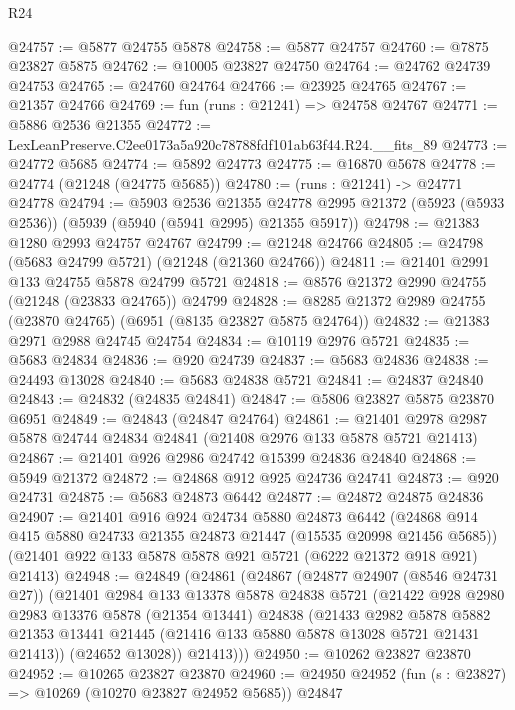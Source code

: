 \begin{lexlean}{R24}
\begin{coremodule}
@24757 := @5877 @24755 @5878
@24758 := @5877 @24757
@24760 := @7875 @23827 @5875
@24762 := @10005 @23827 @24750
@24764 := @24762 @24739 @24753
@24765 := @24760 @24764
@24766 := @23925 @24765
@24767 := @21357 @24766
@24769 := fun (runs : @21241) => @24758 @24767
@24771 := @5886 @2536 @21355
@24772 := LexLeanPreserve.C2ee0173a5a920c78788fdf101ab63f44.R24.__fits_89
@24773 := @24772 @5685
@24774 := @5892 @24773
@24775 := @16870 @5678
@24778 := @24774 (@21248 (@24775 @5685))
@24780 := (runs : @21241) -> @24771 @24778
@24794 := @5903
    @2536
    @21355
    @24778
    @2995
    @21372
    (@5923 (@5933 @2536))
    (@5939 (@5940 (@5941 @2995) @21355 @5917))
@24798 := @21383 @1280 @2993 @24757 @24767
@24799 := @21248 @24766
@24805 := @24798 (@5683 @24799 @5721) (@21248 (@21360 @24766))
@24811 := @21401 @2991 @133 @24755 @5878 @24799 @5721
@24818 := @8576 @21372 @2990 @24755 (@21248 (@23833 @24765)) @24799
@24828 := @8285 @21372 @2989 @24755 (@23870 @24765) (@6951 (@8135 @23827 @5875 @24764))
@24832 := @21383 @2971 @2988 @24745 @24754
@24834 := @10119 @2976 @5721
@24835 := @5683 @24834
@24836 := @920 @24739
@24837 := @5683 @24836
@24838 := @24493 @13028
@24840 := @5683 @24838 @5721
@24841 := @24837 @24840
@24843 := @24832 (@24835 @24841)
@24847 := @5806 @23827 @5875 @23870 @6951
@24849 := @24843 (@24847 @24764)
@24861 := @21401 @2978 @2987 @5878 @24744 @24834 @24841 (@21408 @2976 @133 @5878 @5721 @21413)
@24867 := @21401 @926 @2986 @24742 @15399 @24836 @24840
@24868 := @5949 @21372
@24872 := @24868 @912 @925 @24736 @24741
@24873 := @920 @24731
@24875 := @5683 @24873 @6442
@24877 := @24872 @24875 @24836
@24907 := @21401
    @916
    @924
    @24734
    @5880
    @24873
    @6442
    (@24868 @914 @415 @5880 @24733 @21355 @24873 @21447 (@15535 @20998 @21456 @5685))
    (@21401 @922 @133 @5878 @5878 @921 @5721 (@6222 @21372 @918 @921) @21413)
@24948 := @24849
    (@24861
      (@24867
        (@24877 @24907 (@8546 @24731 @27))
        (@21401
          @2984
          @133
          @13378
          @5878
          @24838
          @5721
          (@21422
            @928
            @2980
            @2983
            @13376
            @5878
            (@21354 @13441)
            @24838
            (@21433
              @2982
              @5878
              @5882
              @21353
              @13441
              @21445
              (@21416 @133 @5880 @5878 @13028 @5721 @21431 @21413))
            (@24652 @13028))
          @21413)))
@24950 := @10262 @23827 @23870
@24952 := @10265 @23827 @23870
@24960 := @24950 @24952 (fun (s : @23827) => @10269 (@10270 @23827 @24952 @5685)) @24847

\end{coremodule}
\end{lexlean}
